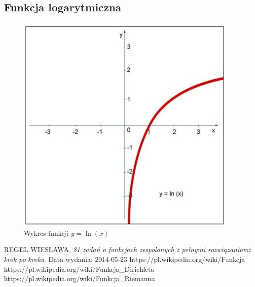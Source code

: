 \documentclass[a4paper]{article}
\begin{document}
\subsection{Funkcja logarytmiczna}
\begin{figure}[!ht]
\label{obrazek2}
\centering
\includegraphics[scale=0.4]{funklog.jpg}
\caption{Wykres funkcji $y=\ln(x)$}%
\end{figure}

\begin{thebibliography}{9}
  REGEL WIESŁAWA,
  \emph{ 81 zadań o funkcjach zespolonych z pełnymi rozwiązaniami krok po kroku}. Data wydania: 2014-05-23
https://pl.wikipedia.org/wiki/Funkcja
https://pl.wikipedia.org/wiki/Funkcja\_Dirichleta
https://pl.wikipedia.org/wiki/Funkcja\_Riemanna
\end{thebibliography}
\end{document}
